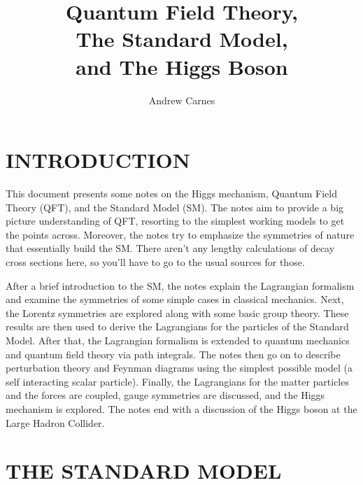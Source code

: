\documentclass[12pt]{article}
\begin{document}


\title{Quantum Field Theory, \\ The Standard Model, \\ and The Higgs Boson}
\author{Andrew Carnes}

\maketitle

\newpage
\tableofcontents
\newpage

\section{INTRODUCTION} \label{intro}
This document presents some notes on the Higgs mechanism, Quantum Field Theory (QFT), and the Standard Model (SM). The notes aim to provide a big picture understanding of QFT, resorting to the simplest working models to get the points across. Moreover, the notes try to emphasize the symmetries of nature that essentially build the SM. There aren't any lengthy calculations of decay cross sections here, so you'll have to go to the usual sources for those.  

After a brief introduction to the SM, the notes explain the Lagrangian formalism and examine the symmetries of some simple cases in classical mechanics. Next, the Lorentz symmetries are explored along with some basic group theory. These results are then used to derive the Lagrangians for the particles of the Standard Model. After that, the Lagrangian formalism is extended to quantum mechanics and quantum field theory via path integrals. The notes then go on to describe perturbation theory and Feynman diagrams using the simplest possible model (a self interacting scalar particle). Finally, the Lagrangians for the matter particles and the forces are coupled, gauge symmetries are discussed, and the Higgs mechanism is explored. The notes end with a discussion of the Higgs boson at the Large Hadron Collider. 

\section{THE STANDARD MODEL} \label{sm}
\end{document}
